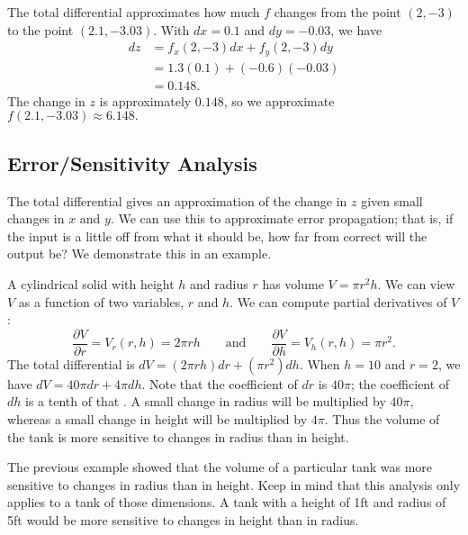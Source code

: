 {The total differential approximates how much $f$ changes from the point $(2,-3)$ to the point $(2.1,-3.03)$. With $dx = 0.1$ and $dy = -0.03$, we have
\begin{align*}
dz &= f_x(2,-3)dx + f_y(2,-3)dy\\
		&= 1.3(0.1) + (-0.6)(-0.03) \\
		&= 0.148.
\end{align*}
The change in $z$ is approximately $0.148$, so we approximate $f(2.1,-3.03)\approx 6.148.$}

\subsection*{Error/Sensitivity Analysis}

The total differential gives an approximation of the change in $z$ given small changes in $x$ and $y$. We can use this to approximate error propagation; that is, if the input is a little off from what it should be, how far from correct will the output be? We demonstrate this in an example.

{A cylindrical solid with height $h$ and radius $r$ has volume $V = \pi r^2h$. We can view $V$ as a function of two variables, $r$ and $h$. We can compute partial derivatives of $V$:
\[\frac{\partial V}{\partial r} = V_r(r,h) = 2\pi rh \qquad \text{and}\qquad \frac{\partial V}{\partial h} = V_h(r,h) = \pi r^2.\]
The total differential is $dV = (2\pi rh)dr + (\pi r^2)dh.$ When $h = 10$ and $r = 2$, we have $dV = 40\pi dr + 4\pi dh$.
Note that the coefficient of $dr$ is $40\pi%
$; the coefficient of $dh$ is a tenth of that%
. A small change in radius will be multiplied by $40\pi$, whereas a small change in height will be multiplied by $4\pi$. Thus the volume of the tank is more sensitive to changes in radius than in height.}

The previous example showed that the volume of a particular tank was more sensitive to changes in radius than in height. Keep in mind that this analysis only applies to a tank of those dimensions. A tank with a height of 1ft and radius of 5ft would be more sensitive to changes in height than in radius.


